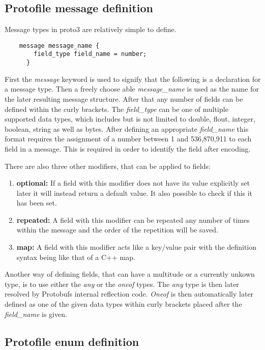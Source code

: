 \subsection{Protofile message definition}

Message types in proto3 are relatively simple to define.

\begin{verbatim}
    message message_name {
        field_type field_name = number;
      }
\end{verbatim}

First the \textit{message} keyword is used to signify that the following is a declaration for a message type. Then a freely choose able \textit{message\_name} is 
used as the name for the later resulting message structure. After that any number of fields can be defined within the curly brackets. The \textit{field\_type} can be
one of multiple supported data types, which includes but is not limited to double, flout, integer, boolean, string as well as bytes. After defining an appropriate
\textit{field\_name} this format requires the assignment of a number between 1 and 536,870,911 to each field in a message. This is required in order to identify
the field after encoding.

There are also three other modifiers, that can be applied to fields:

\begin{enumerate}
    \item \textbf{optional:} If a field with this modifier does not have its value explicitly set later it will instead return a default value. It also possible to check if this it has been set.
    \item \textbf{repeated:} A field with this modifier can be repeated any number of times within the message and the order of the repetition will be saved.
    \item \textbf{map:} A field with this modifier acts like a key/value pair with the definition syntax being like that of a C++ map.
\end{enumerate}

Another way of defining fields, that can have a multitude or a currently unkown type, is to use either the \textit{any} or the \textit{oneof} types.
The \textit{any} type is then later resolved by Protobufs internal reflection code.
\textit{Oneof} is then automatically later defined as one of the given data types within curly brackets placed after the \textit{field\_name} is given.

\subsection{Protofile enum definition}

